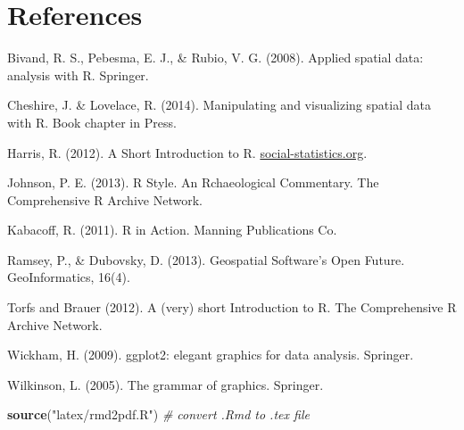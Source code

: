 \documentclass[]{article}
\newenvironment{Shaded}{}{}
\newcommand{\KeywordTok}[1]{\textcolor[rgb]{0.00,0.44,0.13}{\textbf{{#1}}}}
\newcommand{\StringTok}[1]{\textcolor[rgb]{0.25,0.44,0.63}{{#1}}}
\newcommand{\CommentTok}[1]{\textcolor[rgb]{0.38,0.63,0.69}{\textit{{#1}}}}
\newcommand{\NormalTok}[1]{{#1}}
\begin{document}
\section{References}\label{references}

Bivand, R. S., Pebesma, E. J., \& Rubio, V. G. (2008). Applied spatial
data: analysis with R. Springer.

Cheshire, J. \& Lovelace, R. (2014). Manipulating and visualizing
spatial data with R. Book chapter in Press.

Harris, R. (2012). A Short Introduction to R.
\href{http://www.social-statistics.org/}{social-statistics.org}.

Johnson, P. E. (2013). R Style. An Rchaeological Commentary. The
Comprehensive R Archive Network.

Kabacoff, R. (2011). R in Action. Manning Publications Co.

Ramsey, P., \& Dubovsky, D. (2013). Geospatial Software's Open Future.
GeoInformatics, 16(4).

Torfs and Brauer (2012). A (very) short Introduction to R. The
Comprehensive R Archive Network.

Wickham, H. (2009). ggplot2: elegant graphics for data analysis.
Springer.

Wilkinson, L. (2005). The grammar of graphics. Springer.

\begin{Shaded}
\begin{Highlighting}[]
\KeywordTok{source}\NormalTok{(}\StringTok{"latex/rmd2pdf.R"}\NormalTok{)  }\CommentTok{# convert .Rmd to .tex file}
\end{Highlighting}
\end{Shaded}
\end{document}
